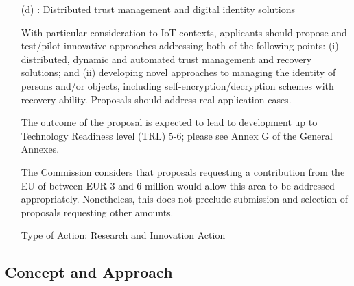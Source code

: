 \documentclass[a4paper,11pt]{article}
\begin{document}
{{\begin{itemize}
The outcome of the proposal is expected to lead to development up to Technology Readiness level (TRL) 6; please see Annex G of the General Annexes.

The Commission considers that proposals requesting a contribution from the EU of between EUR 2 and 5 million would allow this specific challenge to be addressed appropriately. Nonetheless, this does not preclude submission and selection of proposals requesting other amounts.

Type of Action: Research and Innovation Action

\item[(d)]: Distributed trust management and digital identity solutions

With particular consideration to IoT contexts, applicants should propose and test/pilot innovative approaches addressing both of the following points: (i) distributed, dynamic and automated trust management and recovery solutions; and (ii) developing novel approaches to managing the identity of persons and/or objects, including self-encryption/decryption schemes with recovery ability. Proposals should address real application cases.

The outcome of the proposal is expected to lead to development up to Technology Readiness level (TRL) 5-6; please see Annex G of the General Annexes.

The Commission considers that proposals requesting a contribution from the EU of between EUR 3 and 6 million would allow this area to be addressed appropriately. Nonetheless, this does not preclude submission and selection of proposals requesting other amounts.

Type of Action: Research and Innovation Action
\end{itemize}

}}


\subsection{Concept and Approach}

\end{document}
